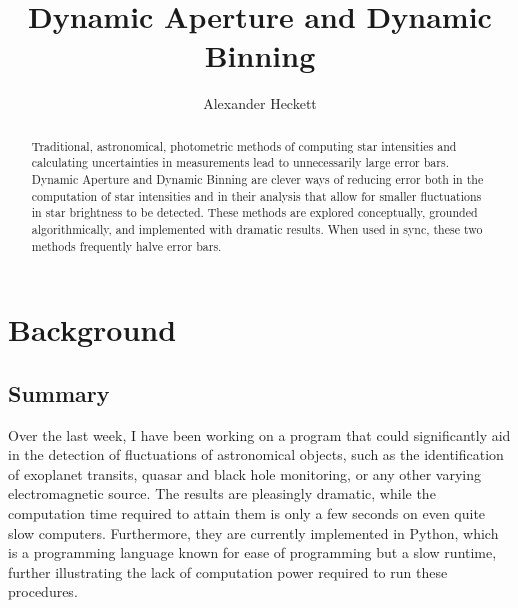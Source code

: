 \documentclass[12pt]{article}
\begin{document}
\title{Dynamic Aperture and Dynamic Binning}
\author{Alexander Heckett}
\maketitle
\begin{abstract}
Traditional, astronomical, photometric methods of computing star intensities and calculating uncertainties in measurements lead to unnecessarily large error bars. Dynamic Aperture and Dynamic Binning are clever ways of reducing error both in the computation of star intensities and in their analysis that allow for smaller fluctuations in star brightness to be detected. These methods are explored conceptually, grounded algorithmically, and implemented with dramatic results. When used in sync, these two methods frequently halve error bars.
\end{abstract}
\tableofcontents
\section{Background}
\subsection{Summary}
\indent \indent Over the last week, I have been working on a program that could significantly aid in the detection of fluctuations of astronomical objects, such as the identification of exoplanet transits, quasar and black hole monitoring, or any other varying electromagnetic source. The results are pleasingly dramatic, while the computation time required to attain them is only a few seconds on even quite slow computers. Furthermore, they are currently implemented in Python, which is a programming language known for ease of programming but a slow runtime, further illustrating the lack of computation power required to run these procedures.
\end{document}
